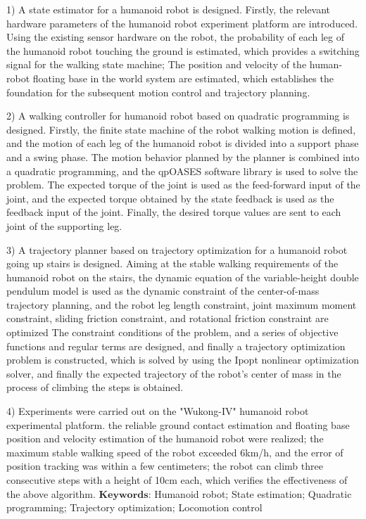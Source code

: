 1) A state estimator for a humanoid robot is designed. Firstly, the relevant hardware parameters of the humanoid robot experiment platform are introduced. 
Using the existing sensor hardware on the robot, the probability of each leg of the humanoid robot touching the ground is estimated, 
which provides a switching signal for the walking state machine; The position and velocity of the human-robot floating base in the world system are estimated, 
which establishes the foundation for the subsequent motion control and trajectory planning.

2) A walking controller for humanoid robot based on quadratic programming is designed. Firstly, the finite state machine of the robot walking motion is defined, 
and the motion of each leg of the humanoid robot is divided into a support phase and a swing phase. The motion behavior planned by the planner is combined into a 
quadratic programming, and the qpOASES software library is used to solve the problem. The expected torque of the joint is used as the feed-forward input of the joint, 
and the expected torque obtained by the state feedback is used as the feedback input of the joint. Finally, the desired torque values are sent to each joint of the supporting leg.

3) A trajectory planner based on trajectory optimization for a humanoid robot going up stairs is designed. Aiming at the stable walking requirements of the humanoid robot 
on the stairs, the dynamic equation of the variable-height double pendulum model is used as the dynamic constraint of the center-of-mass trajectory planning, and the robot 
leg length constraint, joint maximum moment constraint, sliding friction constraint, and rotational friction constraint are optimized The constraint conditions of the problem, 
and a series of objective functions and regular terms are designed, and finally a trajectory optimization problem is constructed, which is solved by using the Ipopt nonlinear 
optimization solver, and finally the expected trajectory of the robot's center of mass in the process of climbing the steps is obtained.

4) Experiments were carried out on the "Wukong-IV" humanoid robot experimental platform. the reliable ground contact estimation and floating base position and velocity 
estimation of the humanoid robot were realized; the maximum stable walking speed of the robot exceeded 6km/h, and the error of position tracking was within a few centimeters; 
the robot can climb three consecutive steps with a height of 10cm each, which verifies the effectiveness of the above algorithm.
$\textbf{Keywords}$: Humanoid robot; State estimation; Quadratic programming; Trajectory optimization; Locomotion control